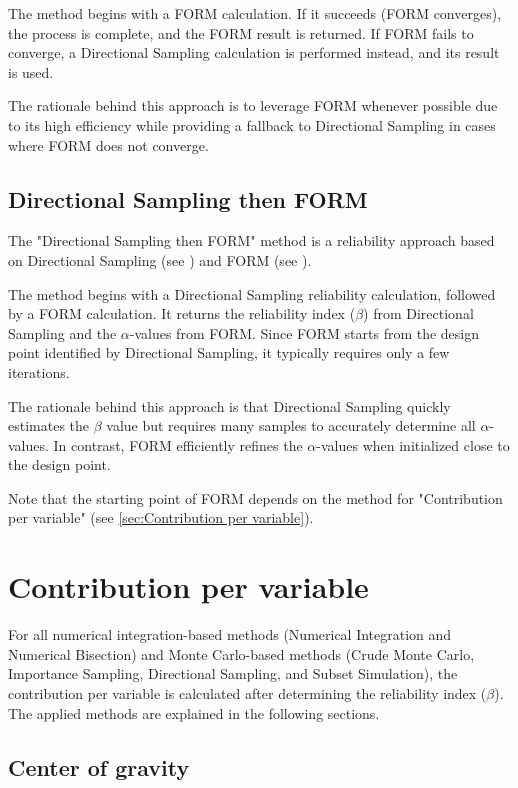 {The method begins with a FORM calculation. If it succeeds (FORM converges), the process is complete, and the FORM result is returned. If FORM fails to converge, a Directional Sampling calculation is performed instead, and its result is used.

The rationale behind this approach is to leverage FORM whenever possible due to its high efficiency while providing a fallback to Directional Sampling in cases where FORM does not converge.

\subsection{Directional Sampling then FORM}
\label{sec:DSFI}

The "Directional Sampling then FORM" method is a reliability approach based on Directional Sampling (see ) and FORM (see ).

The method begins with a Directional Sampling reliability calculation, followed by a FORM calculation. It returns the reliability index ($\beta$) from Directional Sampling and the $\alpha$-values from FORM. Since FORM starts from the design point identified by Directional Sampling, it typically requires only a few iterations.

The rationale behind this approach is that Directional Sampling quickly estimates the $\beta$ value but requires many samples to accurately determine all $\alpha$-values. In contrast, FORM efficiently refines the $\alpha$-values when initialized close to the design point.

Note that the starting point of FORM depends on the method for "Contribution per variable" (see \autoref{sec:Contribution per variable}).

\section{Contribution per variable}
\label{sec:Contribution per variable}

For all numerical integration-based methods (Numerical Integration and Numerical Bisection) and Monte Carlo-based methods (Crude Monte Carlo, Importance Sampling, Directional Sampling, and Subset Simulation), the contribution per variable is calculated after determining the reliability index ($\beta$). The applied methods are explained in the following sections.

\subsection{Center of gravity}
\label{sec:CenterOfGravity}

}
